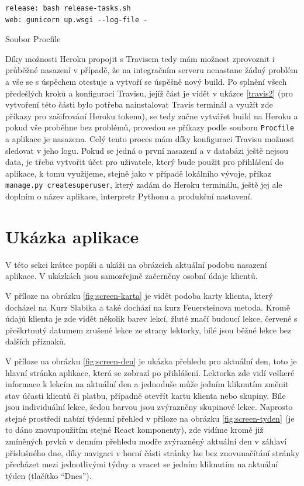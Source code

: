     \begin{listing}[ht]
    	\begin{verbatim}
release: bash release-tasks.sh
web: gunicorn up.wsgi --log-file -
    	\end{verbatim}
    	\caption{Soubor Procfile}\label{lst:procfile}
    \end{listing}
    
    Díky možnosti Heroku propojit s Travisem \cite{travis-heroku} tedy mám možnost zprovoznit i průběžné nasazení v případě, že na integračním serveru nenastane žádný problém a vše se s úspěchem otestuje a vytvoří se úspěšně nový build. Po splnění všech předešlých kroků a konfiguraci Travisu, jejíž část je vidět v ukázce \ref{travis2} (pro vytvoření této části bylo potřeba nainstalovat Travis terminál a využít zde příkazy pro zašifrování Heroku tokenu), se tedy začne vytvářet build na Heroku a pokud vše proběhne bez problémů, provedou se příkazy podle souboru \verb|Procfile| a aplikace je nasazena. Celý tento proces mám díky konfiguraci Travisu možnost sledovat v jeho logu. Pokud se jedná o první nasazení a v databázi ještě nejsou data, je třeba vytvořit účet pro uživatele, který bude použit pro přihlášení do aplikace, k tomu využijeme, stejně jako v případě lokálního vývoje, příkaz \verb|manage.py createsuperuser|, který zadám do Heroku terminálu, ještě jej ale doplním o název aplikace, interpretr Pythonu a produkční nastavení.
    
    \section{Ukázka aplikace}
    V této sekci krátce popíši a ukáži na obrázcích aktuální podobu nasazení aplikace. V ukázkách jsou samozřejmě začerněny osobní údaje klientů.
    
    V příloze na obrázku \ref{fig:screen-karta} je vidět podoba karty klienta, který docházel na Kurz Slabika a také dochází na kurz Feuersteinova metoda. Kromě údajů klienta je zde vidět několik barev lekcí, žluté značí budoucí lekce, červené s přeškrtnutý datumem zrušené lekce ze strany lektorky, bílé jsou běžné lekce bez dalších příznaků.
    
    V příloze na obrázku \ref{fig:screen-den} je ukázka přehledu pro aktuální den, toto je hlavní stránka aplikace, která se zobrazí po přihlášení. Lektorka zde vidí veškeré informace k lekcím na aktuální den a jednoduše může jedním kliknutím změnit stav účasti klientů či platbu, případně otevřít kartu klienta nebo skupiny. Bíle jsou individuální lekce, šedou barvou jsou zvýrazněny skupinové lekce. Naprosto stejné prostředí nabízí týdenní přehled v příloze na obrázku \ref{fig:screen-tyden} (je to dáno znovupoužitím stejné React komponenty), zde vidíme kromě již zmíněných prvků v denním přehledu modře zvýrazněný aktuální den v záhlaví příslušného dne, díky navigaci v horní části stránky lze bez znovunačítání stránky přecházet mezi jednotlivými týdny a vracet se jedním kliknutím na aktuální týden (tlačítko \enquote{Dnes}).
    

